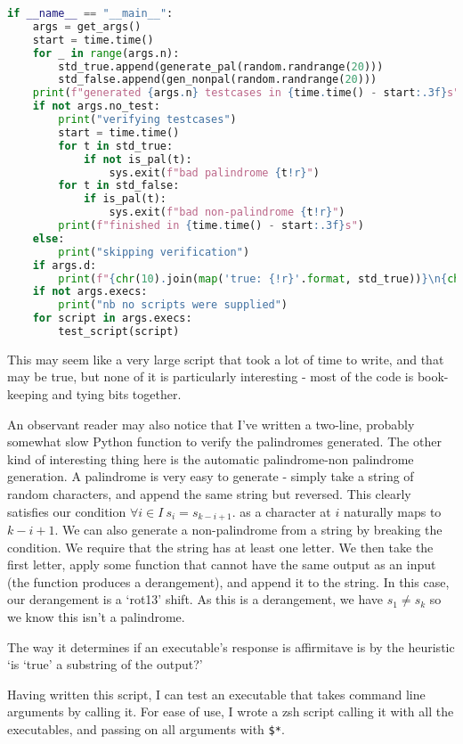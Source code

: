 \documentclass[fleqn,a4paper,11pt]{article}
\begin{document}
\begin{lstlisting}[language=Python, caption=Testing script]
if __name__ == "__main__":
    args = get_args()
    start = time.time()
    for _ in range(args.n):
        std_true.append(generate_pal(random.randrange(20)))
        std_false.append(gen_nonpal(random.randrange(20)))
    print(f"generated {args.n} testcases in {time.time() - start:.3f}s")
    if not args.no_test:
        print("verifying testcases")
        start = time.time()
        for t in std_true:
            if not is_pal(t):
                sys.exit(f"bad palindrome {t!r}")
        for t in std_false:
            if is_pal(t):
                sys.exit(f"bad non-palindrome {t!r}")
        print(f"finished in {time.time() - start:.3f}s")
    else:
        print("skipping verification")
    if args.d:
        print(f"{chr(10).join(map('true: {!r}'.format, std_true))}\n{chr(10).join(map('false: {!r}'.format, std_false))}")
    if not args.execs:
        print("nb no scripts were supplied")
    for script in args.execs:
        test_script(script)
\end{lstlisting}

    This may seem like a very large script that took a lot of time to write, and
    that may be true, but none of it is particularly interesting - most of the
    code is book-keeping and tying bits together.

    An observant reader may also notice that I've written a two-line, probably
    somewhat slow Python function to verify the palindromes generated. The other
    kind of interesting thing here is the automatic palindrome-non palindrome
    generation. A palindrome is very easy to generate - simply take a string of
    random characters, and append the same string but reversed. This clearly
    satisfies our condition
    \( \forall i \in I\ s_i = s_{k - i + 1} \).
    as a character at \(i\) naturally maps to \(k - i + 1\). We can also
    generate a non-palindrome from a string by breaking the condition. We
    require that the string has at least one letter. We then take the first
    letter, apply some function that cannot have the same output as an input
    (the function produces a derangement), and append it to the string. In this
    case, our derangement is a `rot13' shift. As this is a derangement, we have
    \( s_1 \neq s_k \) so we know this isn't a palindrome.

    The way it determines if an executable's response is affirmitave is by the
    heuristic `is `true' a substring of the output?'

    Having written this script, I can test an executable that takes command
    line arguments by calling it. For ease of use, I wrote a zsh script calling
    it with all the executables, and passing on all arguments with \verb|$*|.
\end{document}
